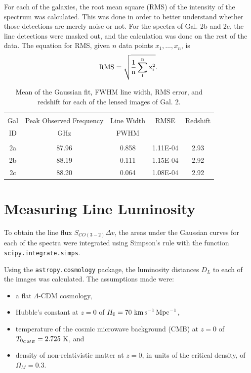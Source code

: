 \documentclass[11pt]{article}
\newcommand{\code}{\texttt}
\begin{document}
For each of the galaxies, the root mean square (RMS) of the intensity of the spectrum was calculated. This was done in order to better understand whether those detections are merely noise or not. For the spectra of Gal. 2b and 2c, the line detections were masked out, and the calculation was done on the rest of the data. The equation for RMS, given $n$ data points $x_1, \ldots, x_n$, is 
\begin{align}\label{eqn:rms}
	\rm{RMS} = \sqrt{\frac{1}{n}\sum_i^nx_i^2}.
\end{align}


\begin{table}[!htbp]
\centering
\begin{tabular}{ccccc}
\hline \\[-0.25cm]
Gal & Peak Observed Frequency & Line Width & RMSE & Redshift \\
ID  & GHz                     & FWHM       &      & \\[0.1cm]
\hline \\[-0.25cm]
2a & 87.96 & 0.858 & 1.11E-04 & 2.93\\
2b & 88.19 & 0.111 & 1.15E-04 & 2.92\\
2c & 88.20 & 0.064 & 1.08E-04 & 2.92\\
\hline
\end{tabular}
\caption{Mean of the Gaussian fit, FWHM line width, RMS error, and redshift for each of the lensed images of Gal. 2.}
\label{table:peaks_zs}
\end{table}

\newpage
\section*{Measuring Line Luminosity}

To obtain the line flux $S_{CO(3-2)}\Delta v$, the areas under the Gaussian curves for each of the spectra were integrated using Simpson's rule with the function \code{scipy.integrate.simps}. 

Using the \code{astropy.cosmology} package, the luminosity distances $D_L$ to each of the images was calculated. The assumptions made were:
\begin{itemize}
	\item a flat $\Lambda$-CDM cosmology,
	\item Hubble's constant at $z=0$ of $H_0 = 70~\rm{km\,s^{-1}\,Mpc^{-1}}$,
	\item temperature of the cosmic microwave background (CMB) at $z=0$ of $T_{0_{CMB}} = 2.725~{\rm K}$, and
	\item density of non-relativistic matter at $z=0$, in units of the critical density, of $\Omega_M = 0.3$.
\end{itemize}
\end{document}
